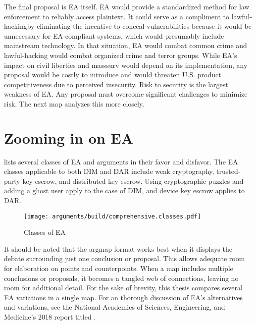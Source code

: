 The final proposal is \ac{EA} itself. \ac{EA} would provide a standardized method for law enforcement to reliably access
\ac{plaintext}. It could serve as a compliment to \ac{lawful-hacking}by eliminating the incentive to conceal
vulnerabilities because it would be unnecessary for \ac{EA}-compliant systems, which would presumably include mainstream
technology. In that situation, \ac{EA} would combat common crime and \ac{lawful-hacking} would combat organized crime
and terror groups. While \ac{EA}'s impact on civil liberties and \ac{masssurv} would depend on its implementation, any
proposal would be costly to introduce and would threaten U.S. product competitiveness due to perceived insecurity. Risk
to security is the largest weakness of \ac{EA}. Any proposal must overcome significant challenges to minimize risk. The
next map analyzes this more closely.


\section{Zooming in on EA}
\label{sec-ea-types}

 lists several classes of \ac{EA} and arguments in their favor and disfavor. The \ac{EA} classes
applicable to both \ac{DIM} and \ac{DAR} include weak cryptography, trusted-party key escrow, and distributed key
escrow. Using cryptographic puzzles and adding a ghost user apply to the case of \ac{DIM}, and device key escrow applies
to \ac{DAR}.

\begin{sidewaysfigure}[p!]
  \centering\CaptionFontSize
  \texttt{[image: arguments/build/comprehensive.classes.pdf]}
  \caption{Classes of EA}
  \label{fig-arg-classes}
\end{sidewaysfigure}

It should be noted that the \ac{argmap} format works best when it displays the debate surrounding just one conclusion or
proposal. This allows adequate room for elaboration on points and counterpoints. When a map includes multiple
conclusions or proposals, it becomes a tangled web of connections, leaving no room for additional detail. For the sake
of brevity, this thesis compares several \ac{EA} variations in a single map. For an thorough discussion of \ac{EA}'s
alternatives and variations, see the National Academies of Sciences, Engineering, and Medicine's 2018 report titled
 \cite{committee_decrypting_2018}.

